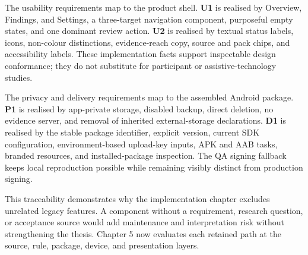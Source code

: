 The usability requirements map to the product shell. \textbf{U1} is realised by Overview, Findings, and Settings, a three-target navigation component, purposeful empty states, and one dominant review action. \textbf{U2} is realised by textual status labels, icons, non-colour distinctions, evidence-reach copy, source and pack chips, and accessibility labels. These implementation facts support inspectable design conformance; they do not substitute for participant or assistive-technology studies.

The privacy and delivery requirements map to the assembled Android package. \textbf{P1} is realised by app-private storage, disabled backup, direct deletion, no evidence server, and removal of inherited external-storage declarations. \textbf{D1} is realised by the stable package identifier, explicit version, current SDK configuration, environment-based upload-key inputs, APK and AAB tasks, branded resources, and installed-package inspection. The QA signing fallback keeps local reproduction possible while remaining visibly distinct from production signing.

This traceability demonstrates why the implementation chapter excludes unrelated legacy features. A component without a requirement, research question, or acceptance source would add maintenance and interpretation risk without strengthening the thesis. Chapter 5 now evaluates each retained path at the source, rule, package, device, and presentation layers.
